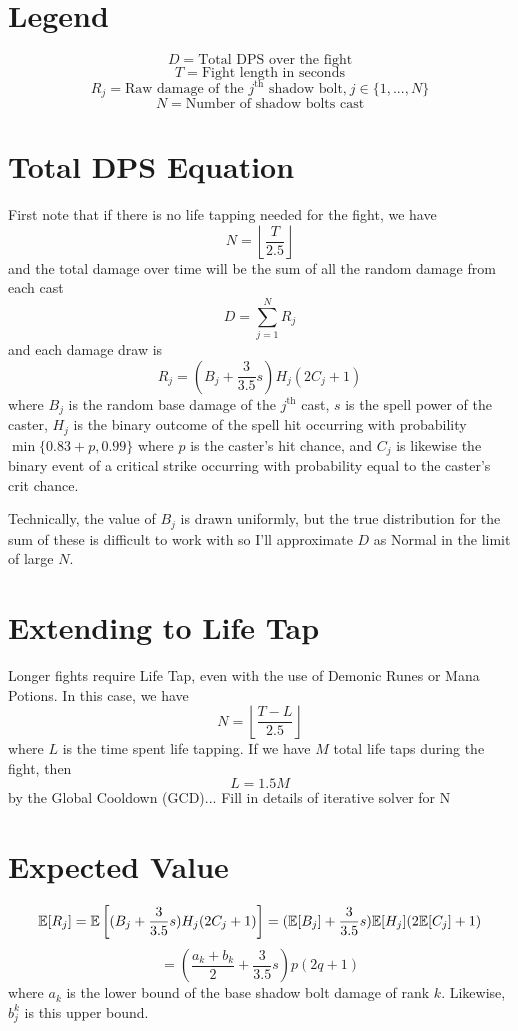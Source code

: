 
\section*{Legend}
$$
D = \text{Total DPS over the fight}
$$
$$
T = \text{Fight length in seconds}
$$
$$
R_j = \text{Raw damage of the $j^\text{th}$ shadow bolt,} \ j \in \{ 1, ..., N \}
$$
$$
N = \text{Number of shadow bolts cast}
$$


\section*{Total DPS Equation}
%
First note that if there is no life tapping needed for the fight, we have
%
$$
N = \left\lfloor \frac{T}{2.5} \right\rfloor
$$
%
and the total damage over time will be the sum of all the random damage from each cast
%
$$
D = \sum_{j=1}^N R_j
$$
%
and each damage draw is
%
$$
R_j = (B_j + \frac{3}{3.5} s) H_j (2 C_j + 1)
$$
%
where $B_j$ is the random base damage of the $j^\text{th}$ cast, $s$ is the spell power of the caster, $H_j$ is the binary outcome of the spell hit occurring with probability $\min \{ 0.83 + p, 0.99 \}$ where $p$ is the caster's hit chance, and $C_j$ is likewise the binary event of a critical strike occurring with probability equal to the caster's crit chance.

Technically, the value of $B_j$ is drawn uniformly, but the true distribution for the sum of these is difficult to work with so I'll approximate $D$ as Normal in the limit of large $N$.



\section*{Extending to Life Tap}
%
Longer fights require Life Tap, even with the use of Demonic Runes or Mana Potions. In this case, we have
%
$$
N = \left\lfloor \frac{T-L}{2.5} \right\rfloor
$$
%
where $L$ is the time spent life tapping. If we have $M$ total life taps during the fight, then
%
$$
L = 1.5 M
$$
%
by the Global Cooldown (GCD)... Fill in details of iterative solver for N



\section*{Expected Value}
%
$$
\mathbb{E}[R_j] = \mathbb{E}\left[ (B_j + \frac{3}{3.5} s) H_j (2 C_j + 1) \right]
= (\mathbb{E}[B_j] + \frac{3}{3.5} s) \mathbb{E}[H_j] (2 \mathbb{E}[C_j] + 1)
$$
$$
= (\frac{a_k + b_k}{2} + \frac{3}{3.5} s) p (2 q + 1)
$$
%
where $a_k$ is the lower bound of the base shadow bolt damage of rank $k$. Likewise, $b_j^k$ is this upper bound.



